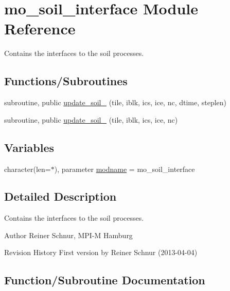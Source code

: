 \hypertarget{namespacemo__soil__interface}{}\section{mo\+\_\+soil\+\_\+interface Module Reference}
\label{namespacemo__soil__interface}


Contains the interfaces to the soil processes.  


\subsection*{Functions/\+Subroutines}
\begin{DoxyCompactItemize}
\item 
subroutine, public \hyperlink{namespacemo__soil__interface_ae4d0b6e8f65eeda1006776c05f071a85}{update\+\_\+soil\+\_} (tile, iblk, ics, ice, nc, dtime, steplen)
\item 
subroutine, public \hyperlink{namespacemo__soil__interface_ac0a837dc7aabd46cf851cef036afaeda}{update\+\_\+soil\+\_} (tile, iblk, ics, ice, nc)
\end{DoxyCompactItemize}
\subsection*{Variables}
\begin{DoxyCompactItemize}
\item 
character(len=$\ast$), parameter \hyperlink{namespacemo__soil__interface_a77346ad1827157005a696fc3bcb7c014}{modname} = \textquotesingle{}mo\+\_\+soil\+\_\+interface\textquotesingle{}
\end{DoxyCompactItemize}


\subsection{Detailed Description}
Contains the interfaces to the soil processes. 

\begin{DoxyAuthor}{Author}
Reiner Schnur, M\+P\+I-\/\+M Hamburg
\end{DoxyAuthor}
\begin{DoxyParagraph}{Revision History}
First version by Reiner Schnur (2013-\/04-\/04) 
\end{DoxyParagraph}


\subsection{Function/\+Subroutine Documentation}
\hypertarget{namespacemo__soil__interface_ae4d0b6e8f65eeda1006776c05f071a85}{}
